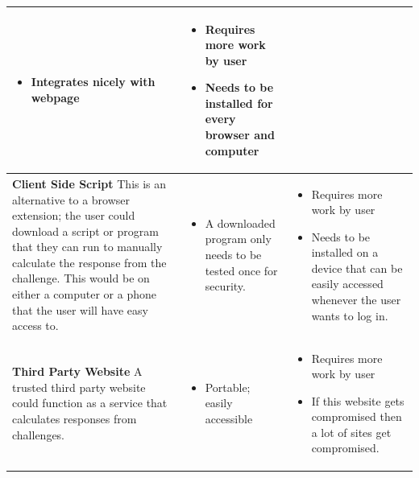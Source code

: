 \documentclass[11pt]{article}
\begin{document}
\begin{center}
\begin{tabular}{|  p{6cm} | p{5cm} | p{5cm} |}
\begin{itemize}[leftmargin=*]
    \item Integrates nicely with webpage
    \end{itemize}
    &
    \begin{itemize}[leftmargin=*]
    \item Requires more work by user

    \item Needs to be installed for every browser and computer
    \end{itemize}

    \\ \hline
    \vspace{.4cm}
    \textbf{Client Side Script}
    This is an alternative to a browser extension; the user could download a script or program that they can run to manually calculate the response from the challenge. This would be on either a computer or a phone that the user will have easy access to.

    &
    \begin{itemize}[leftmargin=*]
      \item A downloaded program only needs to be tested once for security.
    \end{itemize}

    &
    
    \begin{itemize}[leftmargin=*]
    \item Requires more work by user
    \item Needs to be installed on a device that can be easily accessed whenever the user wants to log in.
    \end{itemize}        

    \\ \hline
    \vspace{.4cm}
    \textbf{Third Party Website}
    A trusted third party website could function as a service that calculates responses from challenges.
    &

    \begin{itemize}[leftmargin=*]
      \item Portable; easily accessible
    \end{itemize}

    &

    \begin{itemize}[leftmargin=*]
      \item Requires more work by user
      \item If this website gets compromised then a lot of sites get compromised.
    \end{itemize}
    
    \\ \hline
    
    \end{tabular}
\end{center}
\end{document}
